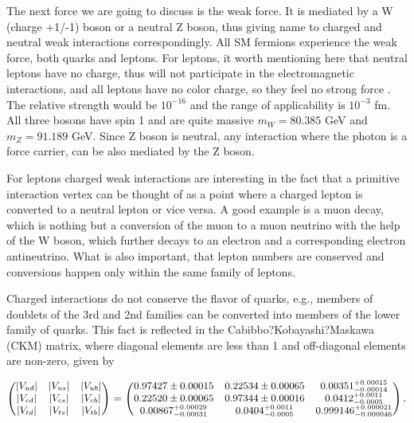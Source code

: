 The next force we are going to discuss is the weak force. It is mediated by a W (charge +1/-1) boson or a neutral Z boson, thus giving name to charged and neutral weak interactions correspondingly. All SM fermions experience the weak force, both quarks and leptons. For leptons, it worth mentioning here that neutral leptons have no charge, thus will not participate in the electromagnetic interactions, and all leptons have no color charge, so they feel no strong force \cite{griffiths_hep}. The relative strength would be  $10^{-16}$ and the range of applicability is $10^{-3}$ fm. All three bosons have spin 1 and are quite massive $m_{W} = 80. 385$ GeV and $m_{Z}=91.189$ GeV. Since Z boson is neutral, any interaction where the photon is a force carrier, can be also mediated by the Z boson.

For leptons charged weak interactions are interesting in the fact that a primitive interaction vertex can be thought of as a point where a charged lepton is converted to a neutral lepton or vice versa. A good example is a muon decay, which is nothing but a conversion of the muon to a muon neutrino with the help of the W boson, which further decays to an electron and a corresponding electron antineutrino. What is also important, that lepton numbers are conserved and conversions happen only within the same family of leptons. 

Charged interactions do not conserve the flavor of quarks, e.g., members of doublets of the 3rd and 2nd families can be converted into members of the lower family of quarks. This fact is reflected in the Cabibbo?Kobayashi?Maskawa (CKM) matrix, where diagonal elements are less than 1 and off-diagonal elements are non-zero, given by  

\begin{equation}
\small
\begin{pmatrix}
|V_{ud}| & |V_{us}| & |V_{ub}| \\
|V_{cd}| & |V_{cs}| & |V_{cb}| \\
|V_{td}| & |V_{ts}| & |V_{tb}|
\end{pmatrix} = \begin{pmatrix}
0.97427 \pm 0.00015 & 0.22534 \pm 0.00065 & 0.00351^{+0.00015}_{-0.00014} \\
0.22520 \pm 0.00065 & 0.97344 \pm 0.00016 & 0.0412^{+0.0011}_{-0.0005} \\
0.00867^{+0.00029}_{-0.00031} & 0.0404^{+0.0011}_{-0.0005} & 0.999146^{+0.000021}_{-0.000046}
\end{pmatrix}.
\label{eq:ckm}
\end{equation}

